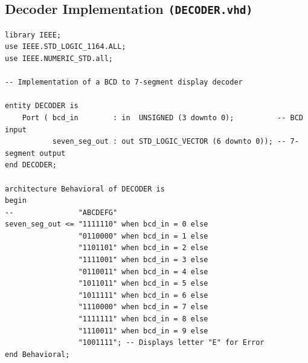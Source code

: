 \documentclass[10pt]{article}
\begin{document}
\subsection{Decoder Implementation \texttt{(DECODER.vhd)}}
\begin{verbatim}
library IEEE;
use IEEE.STD_LOGIC_1164.ALL;
use IEEE.NUMERIC_STD.all;

-- Implementation of a BCD to 7-segment display decoder

entity DECODER is
    Port ( bcd_in        : in  UNSIGNED (3 downto 0);          -- BCD input
           seven_seg_out : out STD_LOGIC_VECTOR (6 downto 0)); -- 7-segment output
end DECODER;

architecture Behavioral of DECODER is
begin
--               "ABCDEFG"
seven_seg_out <= "1111110" when bcd_in = 0 else 
                 "0110000" when bcd_in = 1 else
                 "1101101" when bcd_in = 2 else
                 "1111001" when bcd_in = 3 else                 
                 "0110011" when bcd_in = 4 else
                 "1011011" when bcd_in = 5 else                 
                 "1011111" when bcd_in = 6 else
                 "1110000" when bcd_in = 7 else
                 "1111111" when bcd_in = 8 else                 
                 "1110011" when bcd_in = 9 else                 
                 "1001111"; -- Displays letter "E" for Error
end Behavioral;
\end{verbatim}
\newpage
\end{document}
